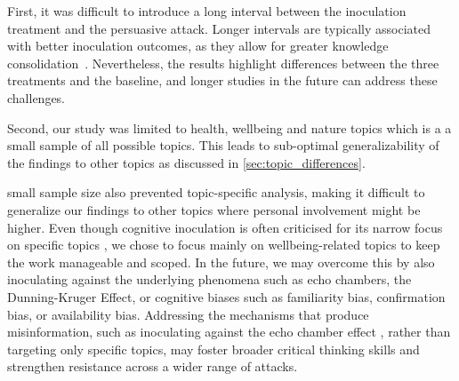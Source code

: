 \documentclass[sigconf]{acmart}
\begin{document}
First, it was difficult to introduce a long interval between the inoculation treatment and the persuasive attack. 
Longer intervals are typically associated with better inoculation outcomes, as they allow for greater knowledge consolidation~\cite{godbold2000}. 
Nevertheless, the results highlight differences between the three treatments and the baseline, and longer studies in the future can address these challenges.

Second, our study was limited to health, wellbeing and nature topics which is a a small sample of all possible topics. 
This leads to sub-optimal generalizability of the findings to other topics as discussed in \autoref{sec:topic_differences}. 

 small sample size also prevented topic-specific analysis, making it difficult to generalize our findings to other topics where personal involvement might be higher. 
Even though cognitive inoculation is often criticised for its narrow focus on specific topics \cite{Basol_Roozenbeek_VanDerLinden_2020}, we chose to focus mainly on wellbeing-related topics to keep the work manageable and scoped. 
In the future, we may overcome this by also inoculating against the underlying phenomena such as echo chambers, the Dunning-Kruger Effect\cite{dunningkruger}, or cognitive biases such as familiarity bias, confirmation bias, or availability bias. 
Addressing the mechanisms that produce misinformation, such as inoculating against the echo chamber effect \cite{Jeon_Kim_Xiong_Lee_Han_2021}, rather than targeting only specific topics, may foster broader critical thinking skills and strengthen resistance across a wider range of attacks.
\end{document}
